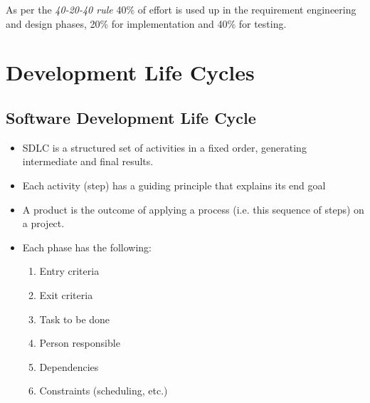 \documentclass{article}
\begin{document}
As per the \textit{40-20-40 rule} 40\% of effort is used up in the requirement engineering and design phases, 20\% for implementation and 40\% for testing. 


\section{Development Life Cycles}
\subsection{Software Development Life Cycle}
\begin{itemize}
    \item SDLC is a structured set of activities in a fixed order, generating intermediate and final results.
    
    \item Each activity (step) has a guiding principle that explains its end goal 
    
    \item A product is the outcome of applying a process (i.e. this sequence of steps) on a project.
    
    \item Each phase has the following:
    \begin{enumerate}
        \item Entry criteria
        \item Exit criteria
        \item Task to be done
        \item Person responsible
        \item Dependencies
        \item Constraints (scheduling, etc.)
    \end{enumerate}
\end{itemize}
\end{document}
